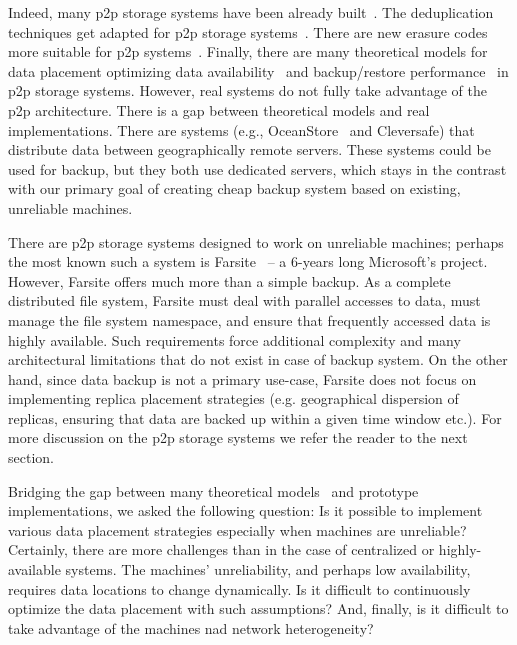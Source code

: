 \documentclass[10pt, final, conference, letterpaper]{IEEEtran}
\begin{document}
Indeed, many p2p storage systems have been already built~\cite{ivyP2PFileSystem, pastisP2PFileSystem, igorFs, bitVault, bigTable, oceanStore, farsiteRetrospection, friendstore, freenet, wualaStudy, pangea}. The deduplication techniques get adapted for p2p storage systems~\cite{XingLD10, conf/p2p/PapapetrouRSN10}. There are new erasure codes more suitable for p2p systems~\cite{conf/infocom/OggierD11}.
Finally, there are many theoretical models for data placement optimizing data availability~\cite{Rzadca2010ReplicaPlacementin, conf/p2p/Pamies-JuarezLA11, Bernard2009OptimizingPeer-to-PeerBackup, douceur2001competitive, chun2006efficient, Bhagwan2002Replicationstrategieshighly,rodrigues2005high} and backup/restore performance~\cite{p2pDataTransferScheduling, conf/p2p/Pamies-JuarezLA10} in p2p storage systems.
However, real systems do not fully take advantage of the p2p architecture. There is a gap between theoretical models and real implementations.
There are systems (e.g., OceanStore~\cite{oceanStore} and Cleversafe) that distribute data between geographically remote servers. These systems could be used for backup, but they both use dedicated servers, which stays in the contrast with our primary goal of creating cheap backup system based on existing, unreliable machines.

There are p2p storage systems designed to work on unreliable machines; perhaps the most known such a system is Farsite~\cite{farsiteRetrospection} -- a 6-years long Microsoft's project. However, Farsite offers much more than a simple backup. As a complete distributed file system, Farsite must deal with parallel accesses to data, must manage the file system namespace, and ensure that frequently accessed data is highly available. Such requirements force additional complexity and many architectural limitations that do not exist in case of  backup system. On the other hand, since data backup is not a primary use-case, Farsite does not focus on implementing replica placement strategies (e.g. geographical dispersion of replicas, ensuring that data are backed up within a given time window etc.). For more discussion on the p2p storage systems we refer the reader to the next section.

Bridging the gap between many theoretical models~\cite{p2pDataTransferScheduling, conf/p2p/Pamies-JuarezLA10, Bernard2009OptimizingPeer-to-PeerBackup, douceur2001competitive, chun2006efficient, Bhagwan2002Replicationstrategieshighly,rodrigues2005high, Rzadca2010ReplicaPlacementin, conf/p2p/Pamies-JuarezLA11} and prototype implementations, we asked the following question: Is it possible to implement various data placement strategies especially when machines are unreliable? Certainly, there are more challenges than in the case of centralized or highly-available systems. The machines' unreliability, and perhaps low availability, requires  data locations to change dynamically. Is it difficult to continuously optimize the data placement with such assumptions? And, finally, is it difficult to take advantage of the machines nad network heterogeneity?
\end{document}
